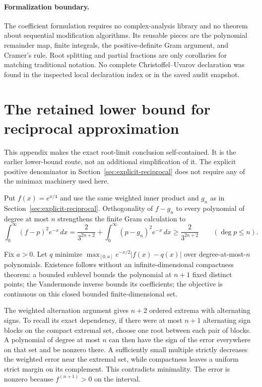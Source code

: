 \documentclass[11pt,a4paper]{article}
\theoremstyle{definition}
\begin{document}
\paragraph{Formalization boundary.}
The coefficient formulation requires no complex-analysis library and
no theorem about sequential modification algorithms. Its reusable
pieces are the polynomial remainder map, finite integrals, the
positive-definite Gram argument, and Cramer's rule. Root splitting
and partial fractions are only corollaries for matching traditional
notation. No complete Christoffel--Uvarov declaration was found in
the inspected local declaration index or in the saved audit snapshot.


\appendix
\section{The retained lower bound for reciprocal approximation}
\label{app:retained-lower}

This appendix makes the exact root-limit conclusion self-contained. It is
the earlier lower-bound route, not an additional simplification of it.
The explicit positive denominator in Section~\ref{sec:explicit-reciprocal}
does not require any of the minimax machinery used here.

Put $f(x)=e^{x/4}$ and use the same weighted inner product and $g_n$ as in
Section~\ref{sec:explicit-reciprocal}. Orthogonality of $f-g_n$ to every
polynomial of degree at most $n$ strengthens the finite Gram calculation to
\begin{equation}
 \int_0^\infty(f-p)^2e^{-x}\,dx
 =\frac2{3^{2n+2}}+\int_0^\infty(p-g_n)^2e^{-x}\,dx
 \ge\frac2{3^{2n+2}}\qquad(\deg p\le n).
 \label{eq:retained-gram-lower}
\end{equation}

Fix $a>0$. Let $q$ minimize
$\max_{[0,a]}e^{-x/2}|f(x)-q(x)|$ over degree-at-most-$n$ polynomials.
Existence follows without an infinite-dimensional compactness theorem:
a bounded sublevel bounds the polynomial at $n+1$ fixed distinct points;
the Vandermonde inverse bounds its coefficients; the objective is continuous
on this closed bounded finite-dimensional set.

The weighted alternation argument gives $n+2$ ordered extrema with alternating
signs. To recall its exact dependency, if there were at most $n+1$ alternating
sign blocks on the compact extremal set, choose one root between each pair
of blocks. A polynomial of degree at most $n$ can then have the sign of the
error everywhere on that set and be nonzero there. A sufficiently small
multiple strictly decreases the weighted error near the extremal set, while
compactness leaves a uniform strict margin on its complement. This contradicts
minimality. The error is nonzero because $f^{(n+1)}>0$ on the interval.
\end{document}
